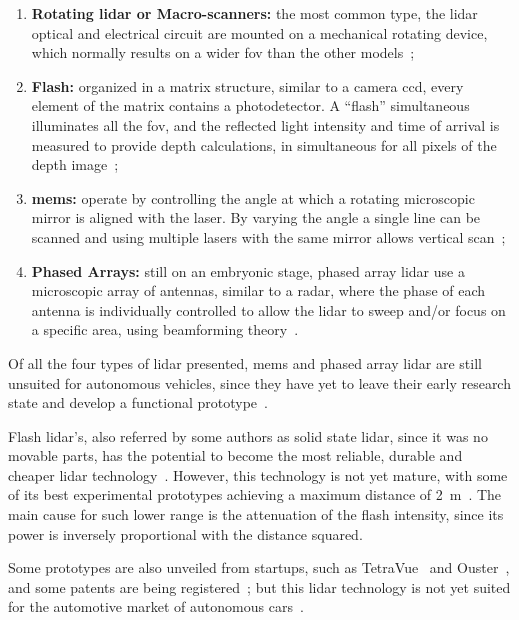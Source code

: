 \begin{enumerate}
	\item \textbf{Rotating \ac{lidar} or Macro-scanners:} the most common type, the \ac{lidar} optical and electrical circuit are mounted on a mechanical rotating device, which normally results on a wider \ac{fov} than the other models~\cite{Sullivan2016};
	\item \textbf{Flash:} organized in a matrix structure, similar to a camera \ac{ccd}, every element of the matrix contains a photodetector. A ``flash'' simultaneous illuminates all the \ac{fov}, and the reflected light intensity and time of arrival is measured to provide depth calculations, in simultaneous for all pixels of the depth image~\cite{TetraVue, Ouster, Gelbart2002,Stettner2010, Simpson2019}; 
	\item \textbf{\ac{mems}:} operate by controlling the angle at which a rotating microscopic mirror is aligned with the \ac{laser}. By varying the angle a single line can be scanned and using multiple \acp{laser} with the same mirror allows vertical scan~\cite{LeddarTech, Yoo2018};
	\item \textbf{Phased Arrays:} still on an embryonic stage, phased array \ac{lidar} use a microscopic array of antennas, similar to a \ac{radar}, where the phase of each antenna is individually controlled to allow the \ac{lidar} to sweep and/or focus on a specific area, using beamforming theory~\cite{Quanergy2018, Yu2016}.
\end{enumerate}

Of all the four types of \ac{lidar} presented, \ac{mems} and phased array \ac{lidar} are still unsuited for autonomous vehicles, since they have yet to leave their early research state and develop a functional prototype~\cite{Sullivan2016, Hecht2018}. 

Flash \ac{lidar}'s, also referred by some authors as solid state \ac{lidar}, since it was no movable parts, has the potential to become the most reliable, durable and cheaper \ac{lidar} technology~\cite{Sullivan2016, Hecht2018, Fersch2017a}. However, this technology is not yet mature, with some of its best experimental  prototypes achieving a maximum distance of \SI{2}{\meter}~\cite{Hecht2018}. The main cause for such lower range is the attenuation of the flash intensity, since its power is inversely proportional with the distance squared.

Some prototypes are also unveiled from startups, such as TetraVue~\cite{TetraVue} and Ouster~\cite{Ouster}, and some patents are being registered~\cite{Simpson2019}; but this \ac{lidar} technology is not yet suited for the automotive market of autonomous cars~\cite{Fersch2017a}.

